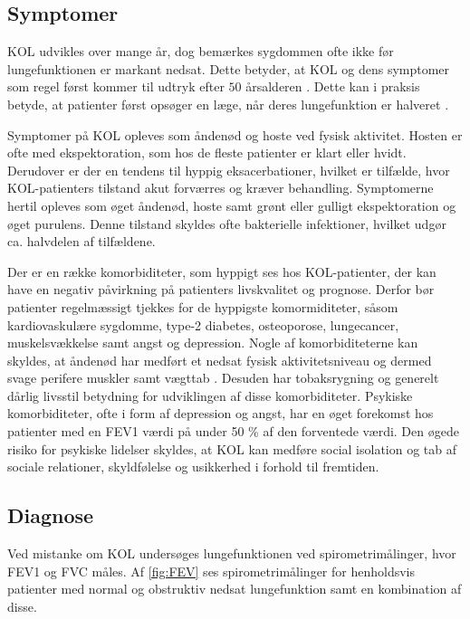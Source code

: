\subsection{Symptomer}
KOL udvikles over mange år, dog bemærkes sygdommen ofte ikke før lungefunktionen er markant nedsat. Dette betyder, at KOL og dens symptomer som regel først kommer til udtryk efter $50$ årsalderen \cite{Lange2015}. Dette kan i praksis betyde, at patienter først opsøger en læge, når deres lungefunktion er halveret \cite{dsam2016}.

Symptomer på KOL opleves som åndenød og hoste ved fysisk aktivitet. Hosten er ofte med ekspektoration, som hos de fleste patienter er klart eller hvidt.\cite{Basisbogen2016} Derudover er der en tendens til hyppig eksacerbationer, hvilket er tilfælde, hvor KOL-patienters tilstand akut forværres og kræver behandling. Symptomerne hertil opleves som øget åndenød, hoste samt grønt eller gulligt ekspektoration og øget purulens. Denne tilstand skyldes ofte bakterielle infektioner, hvilket udgør ca. halvdelen af tilfældene.\cite{dsam2016,Basisbogen2016} 

Der er en række komorbiditeter, som hyppigt ses hos KOL-patienter, der kan have en negativ påvirkning på patienters livskvalitet og prognose. Derfor bør patienter regelmæssigt tjekkes for de hyppigste komormiditeter, såsom kardiovaskulære sygdomme, type-2 diabetes, osteoporose, lungecancer, muskelsvækkelse samt angst og depression.
Nogle af komorbiditeterne kan skyldes, at åndenød har medført et nedsat fysisk aktivitetsniveau og dermed svage perifere muskler samt vægttab \cite{dsam2016}. Desuden har tobaksrygning og generelt dårlig livsstil betydning for udviklingen af disse komorbiditeter.\cite{dsam2016, McCarthy2015}
Psykiske komorbiditeter, ofte i form af depression og angst, har en øget forekomst hos patienter med en FEV1 værdi på under 50 \% af den forventede værdi. Den øgede risiko for psykiske lidelser skyldes, at KOL kan medføre social isolation og tab af sociale relationer, skyldfølelse og usikkerhed i forhold til fremtiden.\cite{dsam2016}


\subsection{Diagnose}
Ved mistanke om KOL undersøges lungefunktionen ved spirometrimålinger, hvor FEV1 og FVC måles. Af \autoref{fig:FEV} ses spirometrimålinger for henholdsvis patienter med normal og obstruktiv nedsat lungefunktion samt en kombination af disse.\cite{Basisbogen2016, Sundhed2013}

